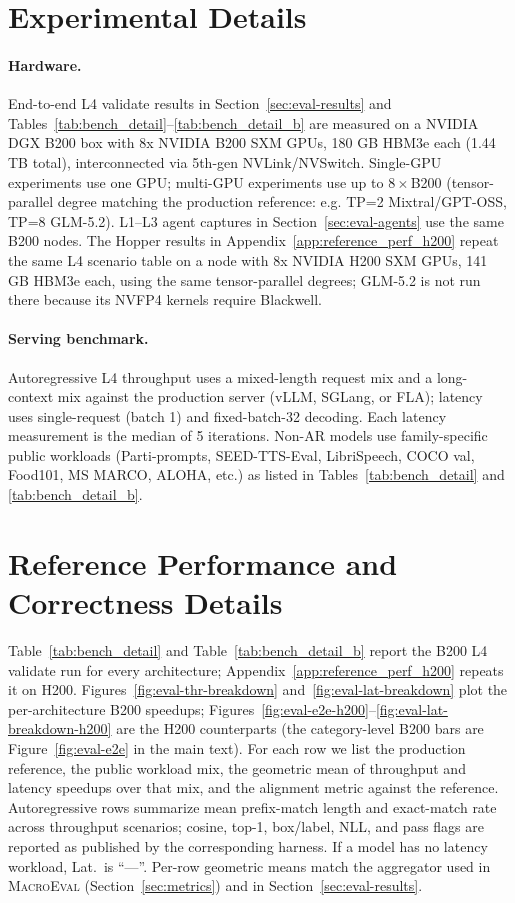 \section{Experimental Details}
\label{app:experimental}

\paragraph{Hardware.}
End-to-end L4 validate results in Section~\ref{sec:eval-results} and Tables~\ref{tab:bench_detail}--\ref{tab:bench_detail_b} are measured on a NVIDIA DGX B200 box with 8x NVIDIA B200 SXM GPUs, 180 GB HBM3e each (1.44 TB total), interconnected via 5th-gen NVLink/NVSwitch.
Single-GPU experiments use one GPU; multi-GPU experiments use up to $8\times$B200 (tensor-parallel degree matching the production reference: e.g. TP=2 Mixtral/GPT-OSS, TP=8 GLM-5.2).
L1--L3 agent captures in Section~\ref{sec:eval-agents} use the same B200 nodes.
The Hopper results in Appendix~\ref{app:reference_perf_h200} repeat the same L4 scenario table on a node with 8x NVIDIA H200 SXM GPUs, 141 GB HBM3e each, using the same tensor-parallel degrees; GLM-5.2 is not run there because its NVFP4 kernels require Blackwell.

\paragraph{Serving benchmark.}
Autoregressive L4 throughput uses a mixed-length request mix and a long-context mix against the production server (vLLM, SGLang, or FLA); latency uses single-request (batch 1) and fixed-batch-32 decoding.
Each latency measurement is the median of 5 iterations.
Non-AR models use family-specific public workloads (Parti-prompts, SEED-TTS-Eval, LibriSpeech, COCO val, Food101, MS MARCO, ALOHA, etc.) as listed in Tables~\ref{tab:bench_detail} and \ref{tab:bench_detail_b}.


\clearpage
\section{Reference Performance and Correctness Details}
\label{app:reference_perf}

Table~\ref{tab:bench_detail} and Table~\ref{tab:bench_detail_b} report the B200 L4 validate run for every architecture; Appendix~\ref{app:reference_perf_h200} repeats it on H200.
Figures~\ref{fig:eval-thr-breakdown} and~\ref{fig:eval-lat-breakdown} plot the per-architecture B200 speedups; Figures~\ref{fig:eval-e2e-h200}--\ref{fig:eval-lat-breakdown-h200} are the H200 counterparts (the category-level B200 bars are Figure~\ref{fig:eval-e2e} in the main text).
For each row we list the production reference, the public workload mix, the geometric mean of throughput and latency speedups over that mix, and the alignment metric against the reference.
Autoregressive rows summarize mean prefix-match length and exact-match rate across throughput scenarios; cosine, top-1, box/label, NLL, and pass flags are reported as published by the corresponding harness.
If a model has no latency workload, Lat.\ is ``---''.
Per-row geometric means match the aggregator used in \textsc{MacroEval} (Section~\ref{sec:metrics}) and in Section~\ref{sec:eval-results}.

